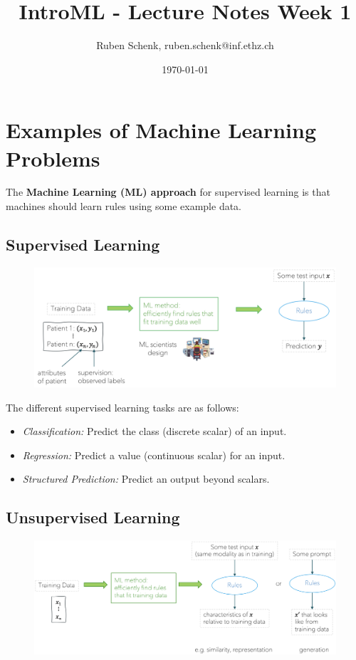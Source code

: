 \documentclass[a4paper]{extarticle}
\title{IntroML - Lecture Notes Week 1}
\author{Ruben Schenk, ruben.schenk@inf.ethz.ch}
\date{\today}
\begin{document}
\maketitle

\section{Examples of Machine Learning Problems}

\begin{ebox}
The \textbf{Machine Learning (ML) approach} for supervised learning is that machines should learn rules using some example data.
\end{ebox}

\subsection{Supervised Learning}

\begin{figure}[H]
\includegraphics[width=15cm]{../images/IntroML_Fig1-1}
\centering
\end{figure}

The different supervised learning tasks are as follows:

\begin{itemize}
	\item \textit{Classification:} Predict the class (discrete scalar) of an input.
	\item \textit{Regression:} Predict a value (continuous scalar) for an input.
	\item \textit{Structured Prediction:} Predict an output beyond scalars.
\end{itemize}

\subsection{Unsupervised Learning}

\begin{figure}[H]
\includegraphics[width=15cm]{../images/IntroML_Fig1-2}
\centering
\end{figure}
\end{document}
